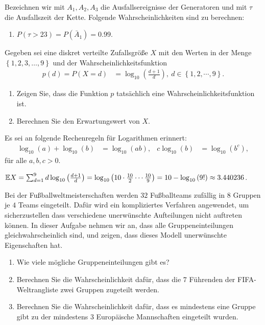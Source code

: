 \solution
Bezeichnen wir mit $A_1, A_2, A_3$ die Ausfallsereignisse der Generatoren
und mit $\tau$ die Ausfallszeit der Kette. Folgende Wahrscheinlichkeiten
sind zu berechnen:
\begin{enumerate}
    \item $P\left( \tau>23 \right) = P( \bar A_1 ) = 0.99$.
\end{enumerate}


Gegeben sei eine diskret verteilte Zufallsgröße $X$ mit den Werten in der Menge
$\left\{ 1,2,3,\dots ,9 \right\}$ und der Wahrscheinlichkeitsfunktion
\begin{align*}
    p(d) = P(X = d) &= \log_{10} \left( \frac{d+1}{d} \right),\  d \in \left\{ 1,2,\cdots,9 \right\}.
\end{align*}
\begin{enumerate}
    \item Zeigen Sie, dass die Funktion $p$ tatsächlich eine Wahrscheinlichkeitsfunktion ist.

    \item Berechnen Sie den Erwartungswert von $X$. 
\end{enumerate}
Es sei an folgende Rechenregeln für Logarithmen erinnert: 
\begin{align*}
    \log_{10} (a) + \log_{10} (b) &= \log_{10} \left( ab \right), & 
    c \log_{10} \left( b \right) &= \log_{10}\left( b^{c} \right), 
\end{align*}
für alle $a,b,c>0$.

\solution
$\mathbb{E} X = \sum_{d=1}^{9} d \log_{10} \left( \frac{d+1}{d} \right) 
    = \log_{10} \left( 10\cdot{} \frac{10}{2} \cdots \frac{10}{9} \right) 
    = 10 - \log_{10} \left( 9! \right) \approx 3.440236$.


 Bei der Fußballweltmeisterschaften
werden $32$ Fußballteams zufällig in $8$ Gruppen je $4$ Teams eingeteilt. Dafür
wird ein kompliziertes Verfahren angewendet, um sicherzustellen dass
verschiedene unerwünschte Aufteilungen nicht auftreten können. In dieser
Aufgabe nehmen wir an, dass alle Gruppeneinteilungen gleichwahrscheinlich sind,
und zeigen, dass dieses Modell unerwünschte Eigenschaften hat. 
\begin{enumerate}
    \item Wie viele mögliche Gruppeneinteilungen gibt es?
    \item Berechnen Sie die Wahrscheinlichkeit dafür, dass die $7$ Führenden
        der FIFA-Weltrangliste zwei Gruppen zugeteilt werden.
    \item Berechnen Sie die Wahrscheinlichkeit dafür, dass es mindestens eine
        Gruppe gibt zu der mindestens $3$ Europäische Mannschaften eingeteilt
        wurden.
\end{enumerate}

